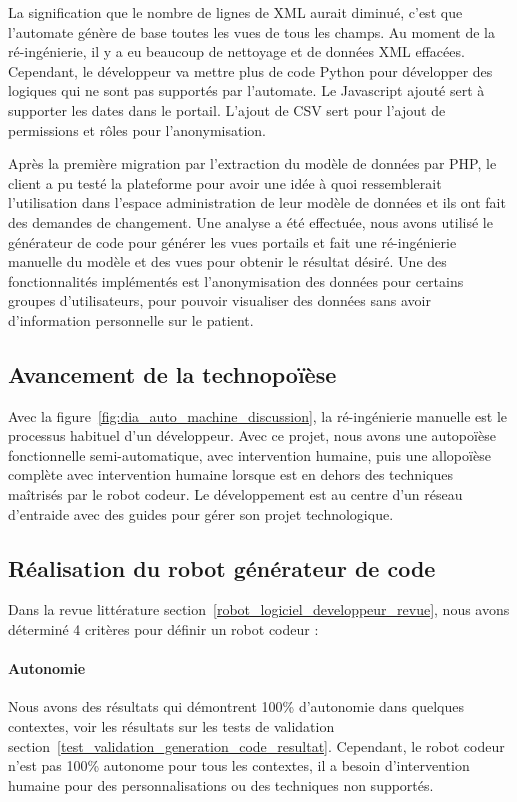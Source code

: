 La signification que le nombre de lignes de XML aurait diminué, c’est que l’automate génère de base toutes les vues de tous les champs. Au moment de la ré-ingénierie, il y a eu beaucoup de nettoyage et de données XML effacées. Cependant, le développeur va mettre plus de code Python pour développer des logiques qui ne sont pas supportés par l’automate. Le Javascript ajouté sert à supporter les dates dans le portail. L’ajout de CSV sert pour l’ajout de permissions et rôles pour l’anonymisation.

Après la première migration par l’extraction du modèle de données par PHP, le client a pu testé la plateforme pour avoir une idée à quoi ressemblerait l’utilisation dans l’espace administration de leur modèle de données et ils ont fait des demandes de changement. Une analyse a été effectuée, nous avons utilisé le générateur de code pour générer les vues portails et fait une ré-ingénierie manuelle du modèle et des vues pour obtenir le résultat désiré. Une des fonctionnalités implémentés est l’anonymisation des données pour certains groupes d’utilisateurs, pour pouvoir visualiser des données sans avoir d’information personnelle sur le patient.

\subsection{Avancement de la technopoïèse}

Avec la figure~\ref{fig:dia_auto_machine_discussion}, la ré-ingénierie manuelle est le processus habituel d'un développeur. Avec ce projet, nous avons une autopoïèse fonctionnelle semi-automatique, avec intervention humaine, puis une allopoïèse complète avec intervention humaine lorsque est en dehors des techniques maîtrisés par le robot codeur. Le développement est au centre d'un réseau d'entraide avec des guides pour gérer son projet technologique.

\subsection{Réalisation du robot générateur de code}

Dans la revue littérature section~\ref{robot_logiciel_developpeur_revue}, nous avons déterminé 4 critères pour définir un robot codeur :
\paragraph{Autonomie}
Nous avons des résultats qui démontrent 100\% d'autonomie dans quelques contextes, voir les résultats sur les tests de validation section~\ref{test_validation_generation_code_resultat}. Cependant, le robot codeur n'est pas 100\% autonome pour tous les contextes, il a besoin d'intervention humaine pour des personnalisations ou des techniques non supportés.

